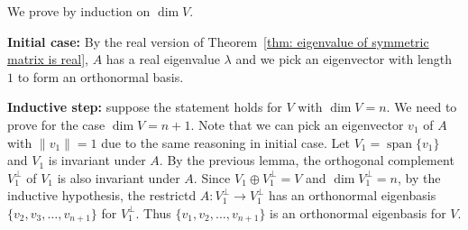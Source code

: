     \begin{proofenv}
        We prove by induction on $\dim V$.

        \textbf{Initial case:} By the real version of Theorem~\ref{thm: eigenvalue of symmetric matrix is real}, $A$ has a real eigenvalue $\lambda$ and we pick an eigenvector with length $1$ to form an orthonormal basis.

        \textbf{Inductive step:} suppose the statement holds for $V$ with $\dim V=n$. We need to prove for the case $\dim V=n+1$. Note that we can pick an eigenvector $v_1$ of $A$ with $\| v_1 \| = 1 $ due to the same reasoning in initial case. Let $V_1 = \operatorname{span} \{ v_1 \}$ and $V_1$ is invariant under $A$. By the previous lemma, the orthogonal complement $V_1^\perp$ of $V_1$ is also invariant under $A$. Since $V_1 \oplus V_1^\perp = V$ and $\dim V_1^\perp = n$, by the inductive hypothesis, the restrictd $A: V_1^\perp \to V_1^\perp$ has an orthonormal eigenbasis $\{v_2, v_3, \ldots, v_{n+1}\}$ for $V_1^\perp$. Thus $\{v_1, v_2, \ldots, v_{n+1}\}$ is an orthonormal eigenbasis for $V$.
    \end{proofenv}
